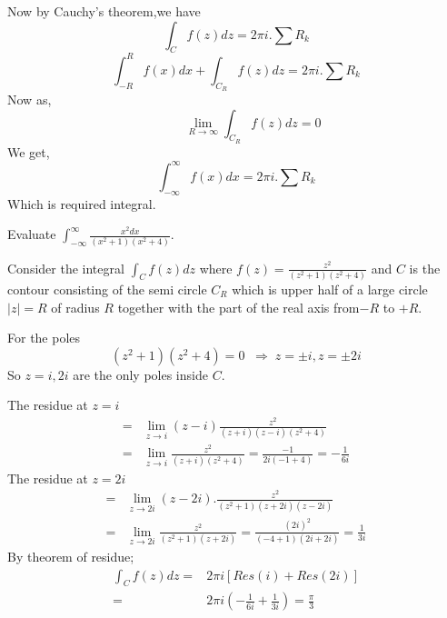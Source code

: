 Now by Cauchy's theorem,we have
\[\int_C f(z) dz = 2\pi i . \sum R_k\]
\[\int_{-R}^R f(x) dx + \int_{C_R} f(z) dz = 2\pi i . \sum R_k\]
Now as,
\[~~~~~~~~~~~~ \lim_{R \rightarrow \infty}\int_{C_R} f(z) dz = 0 \]
We get, 
\[\int_{-\infty}^{\infty} f(x) dx = 2\pi i . \sum R_k\]
Which is required integral.														

\begin{example}
Evaluate $\int_{-\infty}^{\infty}\frac{x^{2}dx}{(x^{2}+1)(x^{2}+4)}$.
\end{example}
\begin{solution}
Consider the integral $\int_{C}f(z)dz$ where $f(z)=\frac{z^{2}}{(z^{2}+1)(z^{2}+4)}$
and $C$ is the contour consisting of the semi circle $C_{R}$ which
is upper half of a large circle $|z|=R$ of radius $R$ together with
the part of the real axis from$-R$ to $+R$. 

For the poles 
\[(z^{2}+1)(z^{2}+4)=0 \;\; \Rightarrow\; z=\pm i,z=\pm2i\]
So $z=i,2i$ are the only poles inside $C$. 

The residue at $z=i$
\begin{align*}
= & \lim_{z\rightarrow i}(z-i)\frac{z^{2}}{(z+i)(z-i)(z^{2}+4)}\\
= & \lim_{z\rightarrow i}\frac{z^{2}}{(z+i)(z^{2}+4)} = \frac{-1}{2i(-1+4)}=-\frac{1}{6i}
\end{align*}
The residue at $z=2i$
\begin{align*}
= & \lim_{z\rightarrow2i}(z-2i).\frac{z^{2}}{(z^{2}+1)(z+2i)(z-2i)}\\
= & \lim_{z\rightarrow2i}\frac{z^{2}}{(z^{2}+1)(z+2i)}=  \frac{(2i)^{2}}{(-4+1)(2i+2i)}=\frac{1}{3i}
\end{align*}
By theorem of residue;
\begin{align*}
\int_{C}f(z)dz= & 2\pi i[Res(i)+Res(2i)]\\
= & 2\pi i(-\frac{1}{6i}+\frac{1}{3i})=\frac{\pi}{3}\end{align*}



\end{solution}
